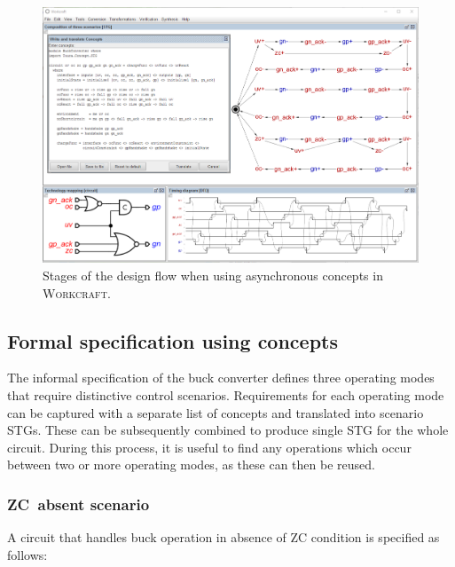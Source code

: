 \documentclass[british, journal]{IEEEtran}
\newcommand{\noun}[1]{\textsc{#1}}
\begin{document}
\begin{figure}[t]
\begin{centering}
\includegraphics[scale=0.51]{Images/design_flow_wc_screenshot}
\par\end{centering}

\protect\caption{\label{fig:workcraft_screenshot}Stages of the design flow when using asynchronous concepts in \noun{Workcraft}.}
\vspace{-4mm}
\end{figure}

\vspace{-1mm}
\subsection{Formal specification using concepts}

The informal specification of the buck converter defines three operating modes
that require distinctive control scenarios. Requirements for each operating mode
can be captured with a separate list of concepts and translated into scenario
STGs. These can be subsequently combined to produce single STG for the whole circuit.
During this process, it is useful to find any operations which occur
between two or more operating modes, as these can then be reused.

\subsubsection{ZC~absent scenario}

A circuit that handles buck operation in absence of ZC condition is specified as follows:
\end{document}
